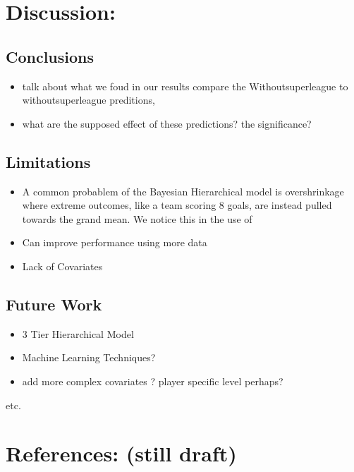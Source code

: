 \documentclass[
]{article}
\providecommand{\tightlist}{%
  \setlength{\itemsep}{0pt}\setlength{\parskip}{0pt}}
\begin{document}
\hypertarget{discussion}{%
\section{Discussion:}\label{discussion}}

\hypertarget{conclusions}{%
\subsection{Conclusions}\label{conclusions}}

\begin{itemize}
\tightlist
\item
  talk about what we foud in our results compare the Withoutsuperleague
  to withoutsuperleague preditions,
\item
  what are the supposed effect of these predictions? the significance?
\end{itemize}

\hypertarget{limitations}{%
\subsection{Limitations}\label{limitations}}

\begin{itemize}
\item
  A common probablem of the Bayesian Hierarchical model is overshrinkage
  where extreme outcomes, like a team scoring 8 goals, are instead
  pulled towards the grand mean. We notice this in the use of
\item
  Can improve performance using more data
\item
  Lack of Covariates
\end{itemize}

\hypertarget{future-work}{%
\subsection{Future Work}\label{future-work}}

\begin{itemize}
\item
  3 Tier Hierarchical Model
\item
  Machine Learning Techniques?
\item
  add more complex covariates ? player specific level perhaps?
\end{itemize}

etc.

\hypertarget{references-still-draft}{%
\section{References: (still draft)}\label{references-still-draft}}
\end{document}
